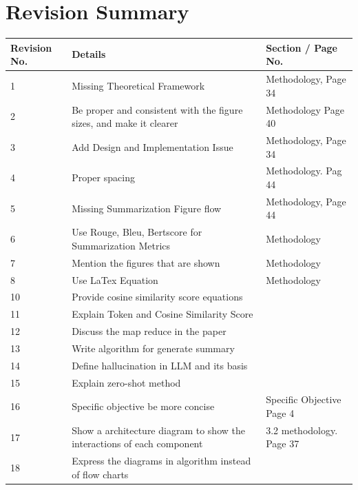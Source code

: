 \chapter*{Revision Summary}

\begingroup
\small
{}
\begin{longtable}{@{}p{1.6cm}p{8.4cm}p{4.4cm}@{}}
  \toprule
  \textbf{Revision No.} & \textbf{Details} & \textbf{Section / Page No.} \\
  \midrule
  \endhead
  1 & Missing Theoretical Framework & Methodology, Page 34 \\
  2 & Be proper and consistent with the figure sizes, and make it clearer & Methodology Page 40 \\
  3 & Add Design and Implementation Issue & Methodology, Page 34 \\
  4 & Proper spacing & Methodology. Pag 44 \\
  5 & Missing Summarization Figure flow & Methodology, Page 44 \\
  6 & Use Rouge, Bleu, Bertscore for Summarization Metrics & Methodology \\
  7 & Mention the figures that are shown & Methodology \\
  8 & Use LaTex Equation & Methodology \\
  10 & Provide cosine similarity score equations &  \\
  11 & Explain Token and Cosine Similarity Score &  \\
  12 & Discuss the map reduce in the paper &  \\
  13 & Write algorithm for generate summary &  \\
  14 & Define hallucination in LLM and its basis &  \\
  15 & Explain zero-shot method &  \\
  16 & Specific objective be more concise & Specific Objective Page 4 \\
  17 & Show a architecture diagram to show the interactions of each component & 3.2 methodology. Page 37 \\
  18 & Express the diagrams in algorithm instead of flow charts &  \\
  \bottomrule
\end{longtable}
\endgroup
\clearpage
